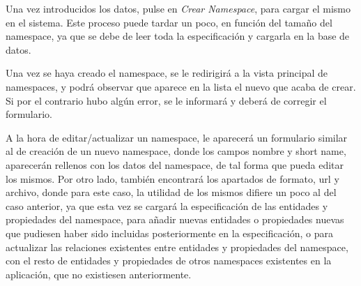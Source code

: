 Una vez introducidos los datos, pulse en \textit{Crear Namespace}, para cargar
el mismo en el sistema. Este proceso puede tardar un poco, en función del tamaño
del namespace, ya que se debe de leer toda la especificación y cargarla en la
base de datos.

Una vez se haya creado el namespace, se le redirigirá a la vista principal de
namespaces, y podrá observar que aparece en la lista el nuevo que acaba de
crear. Si por el contrario hubo algún error, se le informará y deberá de
corregir el formulario.

A la hora de editar/actualizar un namespace, le aparecerá un formulario similar
al de creación de un nuevo namespace, donde los campos nombre y short name,
aparecerán rellenos con los datos del namespace, de tal forma que pueda editar
los mismos. Por otro lado, también encontrará los apartados de formato, url y
archivo, donde para este caso, la utilidad de los mismos difiere un poco al del
caso anterior, ya que esta vez se cargará la especificación de las entidades y
propiedades del namespace, para añadir nuevas entidades o propiedades nuevas que
pudiesen haber sido incluidas posteriormente en la especificación, o para
actualizar las relaciones existentes entre entidades y propiedades del
namespace, con el resto de entidades y propiedades de otros namespaces
existentes en la aplicación, que no existiesen anteriormente.

